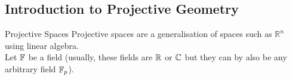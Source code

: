 \subsection{Introduction to Projective Geometry}

\begin{definitionBox}{Projective Spaces}
Projective spaces are a generalisation of spaces such as $\mathbb{R}^n$ using linear algebra. \\
Let $\mathbb{F}$ be a field (usually, these fields are $\mathbb{R}$ or $\mathbb{C}$ but they can by also be any arbitrary field $\mathbb{F}_p$).
\end{definitionBox}
